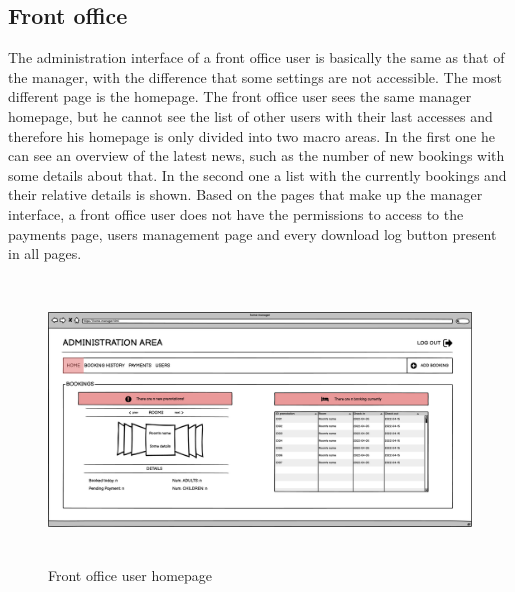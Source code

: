 \subsection{Front office}
The administration interface of a front office user is basically the same as that of the manager, with the difference that some settings are not accessible.
The most different page is the homepage. The front office user sees the same manager homepage, but he cannot see the list of other users with their last accesses and therefore his homepage is only divided into two macro areas. In the first one he can see an overview of the latest news, such as the number of new bookings with some details about that. In the second one a list with the currently bookings and their relative details is shown.
Based on the pages that make up the manager interface, a front office user does not have the permissions to access to the payments page, users management page and every download log button present in all pages.
\begin{figure}[H]
	\centering
	\includegraphics[height=7.5cm]{images/frontOffice-index.png} 
	\caption{Front office user homepage}
\end{figure}
